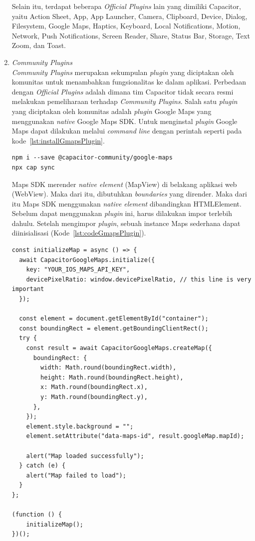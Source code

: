 \begin{enumerate}
\begin{enumerate}
		\end{enumerate}				
		
		Selain itu, terdapat beberapa \textit{Official Plugins} lain yang dimiliki Capacitor, yaitu Action Sheet, App, App Launcher, Camera, Clipboard, Device, Dialog, Filesystem, Google Maps, Haptics, Keyboard, Local Notifications, Motion, Network, Push Notifications, Screen Reader, Share, Status Bar, Storage, Text Zoom, dan Toast.
		\newpage
	\item \textit{Community Plugins} \\
		\textit{Community Plugins} merupakan sekumpulan \textit{plugin} yang diciptakan oleh komunitas untuk menambahkan fungsionalitas ke dalam aplikasi. Perbedaan dengan \textit{Official Plugins} adalah dimana tim Capacitor tidak secara resmi melakukan pemeliharaan terhadap \textit{Community Plugins}. Salah satu \textit{plugin} yang diciptakan oleh komunitas adalah \textit{plugin }Google Maps yang menggunakan \textit{native} Google Maps SDK. Untuk menginstal \textit{plugin} Google Maps dapat dilakukan melalui \textit{command line} dengan perintah seperti pada kode~\ref{lst:installGmapsPlugin}.	
		
\begin{lstlisting}[label={lst:installGmapsPlugin}, caption=Kode untuk Menginstal \textit{Plugin} Google Maps]
npm i --save @capacitor-community/google-maps
npx cap sync
\end{lstlisting}

	Maps SDK merender \textit{native element} (MapView) di belakang aplikasi web (WebView). Maka dari itu, dibutuhkan \textit{boundaries} yang dirender. Maka dari itu Maps SDK menggunakan \textit{native element} dibandingkan HTMLElement. Sebelum dapat menggunakan \textit{plugin} ini, harus dilakukan impor terlebih dahulu. Setelah mengimpor \textit{plugin}, sebuah instance Maps sederhana dapat diinisialisasi (Kode~\ref{lst:codeGmapsPlugin}).

	
\begin{lstlisting}[label={lst:codeGmapsPlugin}, caption=Contoh Kode Penggunaan \textit{Plugin} Google Maps]
const initializeMap = async () => {
  await CapacitorGoogleMaps.initialize({
    key: "YOUR_IOS_MAPS_API_KEY",
    devicePixelRatio: window.devicePixelRatio, // this line is very important
  });

  const element = document.getElementById("container");
  const boundingRect = element.getBoundingClientRect();
  try {
    const result = await CapacitorGoogleMaps.createMap({
      boundingRect: {
        width: Math.round(boundingRect.width),
        height: Math.round(boundingRect.height),
        x: Math.round(boundingRect.x),
        y: Math.round(boundingRect.y),
      },
    });
    element.style.background = "";
    element.setAttribute("data-maps-id", result.googleMap.mapId);

    alert("Map loaded successfully");
  } catch (e) {
    alert("Map failed to load");
  }
};

(function () {
	initializeMap();
})();
\end{lstlisting}
	
\end{enumerate}

